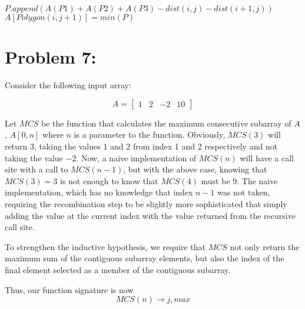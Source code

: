 \documentclass[12pt]{article}
\begin{document}
\begin{algorithm}[H]
\\
\\
{
{
}
}
\\
{
\\
{
\\
\\
\\
$P.append(A(P1)+A(P2)+A(P3)-dist(i,j)-dist(i+1,j))$
}    
$A[Polygon(i,j+1)]=min(P)$
}
\end{algorithm}

\section*{Problem 7: }

Consider the following input array:

\[
A =
  \begin{bmatrix}
    1 & 2 & -2 & 10
  \end{bmatrix}
\]

Let $MCS$ be the function that calculates the maximum consecutive subarray of $A$, $A[0, n]$ where $n$ is a parameter to the function. Obviously, $MCS(3)$ will return $3$, taking the values 1 and 2 from index 1 and 2 respectively and not taking the value $-2$. Now, a naive implementation of $MCS(n)$ will have a call site with a call to $MCS(n-1)$, but with the above case, knowing that $MCS(3) = 3$ is not enough to know that $MCS(4)$ must be 9. The naive implementation, which has no knowledge that index $n-1$ was not taken, requiring the recombination step to be slightly more sophisticated that simply adding the value at the current index with the value returned from the recursive call site.

To strengthen the inductive hypothesis, we require that $MCS$ not only return the maximum sum of the contiguous subarray elements, but also the index of the final element selected as a member of the contiguous subarray.

Thus, our function signature is now
\[
MCS(n) \to j, max
\]
\end{document}
